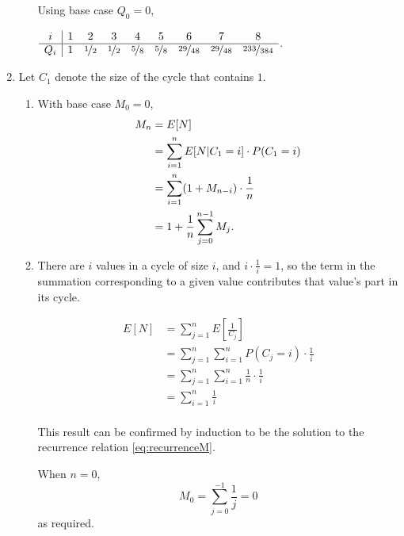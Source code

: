 \documentclass{article}
\begin{document}
\begin{enumerate}
\begin{enumerate}
    Using base case $Q_0=0$,
    \begin{center}
    $\begin{array}{c|cccccccc}
        i & 1 & 2 & 3 & 4 & 5 & 6 & 7 & 8 \\
        \hline
        Q_i & 1 & \nicefrac{1}{2} & \nicefrac{1}{2} & \nicefrac{5}{8} & \nicefrac{5}{8} & \nicefrac{29}{48} & \nicefrac{29}{48} & \nicefrac{233}{384}
    \end{array}$.
    \end{center}
    \end{enumerate}
\item
    Let $C_1$ denote the size of the cycle that contains $1$.
    \begin{enumerate}
    \item
        With base case $M_0=0$,
        \[\begin{split}\label{eq:recurrenceM}
        M_n & = E[N] \\
            & = \sum_{i=1}^n E[N|C_1=i]\cdot P(C_1=i) \\
            & = \sum_{i=1}^n (1+M_{n-i})\cdot \frac{1}{n} \\
            & = 1 + \frac{1}{n}\sum_{j=0}^{n-1} M_j \text.
        \end{split}\]
    \item
        There are $i$ values in a cycle of size $i$, and $i\cdot\frac{1}{i}=1$, so the term in the summation corresponding
        to a given value contributes that value's part in its cycle.

        \[\begin{split}
        E[N]    & = \sum_{j=1}^n E\left[\frac{1}{C_j}\right] \\
                & = \sum_{j=1}^n \sum_{i=1}^n P( C_j=i ) \cdot \frac{1}{i} \\
                & = \sum_{j=1}^n \sum_{i=1}^n \frac{1}{n} \cdot \frac{1}{i} \\
                & = \sum_{i=1}^n \frac{1}{i} \\
        \end{split}\]

        This result can be confirmed by induction to be the solution to the recurrence relation \eqref{eq:recurrenceM}.

        When $n=0$,
        \[ M_0 = \sum_{j=0}^{-1} \frac{1}{j} = 0 \]
        as required.


\end{enumerate}
\end{enumerate}
\end{document}
